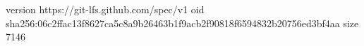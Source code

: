 version https://git-lfs.github.com/spec/v1
oid sha256:06c2ffac13f8627ca5c8a9b26463b1f9acb2f90818f6594832b20756ed3bf4aa
size 7146

